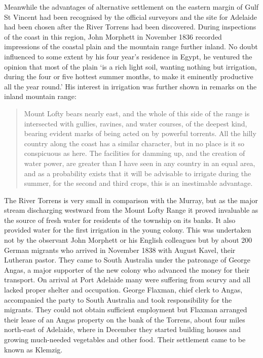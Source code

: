 Meanwhile the advantages of alternative settlement on the eastern
margin of Gulf St Vincent  had been
recognised by the official surveyors and the site for Adelaide
 had
been chosen after the River Torrens  had been
discovered.  During inspections of the coast in this region, John
Morphett  in November 1836 recorded impressions of
the coastal plain and the mountain range further inland.  No doubt
influenced to some extent by his four year's residence in Egypt, he
ventured the opinion that most of the plain `is a rich light soil,
wanting nothing but irrigation, during the four or five hottest summer
months, to make it eminently productive all the year round.'  His
interest in irrigation was further shown in remarks on the inland
mountain range:
\begin{quote}
	Mount Lofty bears nearly east, and the whole of this side of
	the range is intersected with gullies, ravines, and water
	courses, of the deepest kind, bearing evident marks of being
	acted on by powerful torrents.  All the hilly country along
	the coast has a similar character, but in no place is it so
	conspicuous as here.  The facilities for damming up, and the
	creation of water power, are greater than I have seen in any
	country in an equal area, and as a probability exists that it
	will be advisable to irrigate during the summer, for the
	second and third crops, this is an inestimable
	advantage.
\end{quote}

The River Torrens is very small in comparison with the Murray, but as
the major stream discharging westward from the Mount Lofty
 Range it
proved invaluable as the source of fresh water for residents of the
township on its banks.  It also provided water for the first
irrigation in the young colony.  This was undertaken not by the
observant John Morphett or his English colleagues but by about 200
German migrants who arrived in November 1838 with August Kavel,
 their
Lutheran pastor.  They came to South Australia under the patronage of
George Angas,  a major supporter of the new colony
who advanced the money for their transport. On arrival at Port
Adelaide many were suffering from scurvy and all lacked proper shelter
and occupation. George Flaxman,  chief clerk to
Angas, accompanied the party to South Australia and took
responsibility for the migrants.  They could not obtain sufficient
employment but Flaxman arranged their lease of an Angas property on
the bank of the Torrens, about four miles north-east of Adelaide,
where in December they started building houses and growing much-needed
vegetables and other food.  Their settlement came to be known as
Klemzig. 

